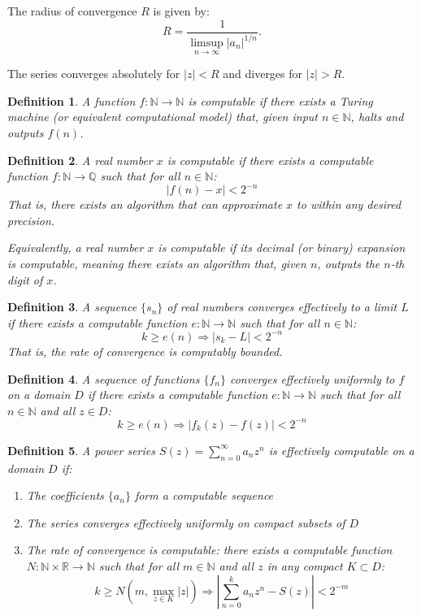 \documentclass[12pt, a4paper]{article}
\newtheorem{definition}{Definition}
\begin{document}
The radius of convergence $R$ is given by:
\[
R = \frac{1}{\limsup_{n \to \infty} |a_n|^{1/n}}.
\]

The series converges absolutely for $|z| < R$ and diverges for $|z| > R$.

\begin{definition} A function $f: \mathbb{N} \to \mathbb{N}$ is \emph{computable} if there exists a Turing machine (or equivalent computational model) that, given input $n \in \mathbb{N}$, halts and outputs $f(n)$.
\end{definition}

\begin{definition}
A real number $x$ is computable if there exists a computable function $f: \mathbb{N} \to \mathbb{Q}$ such that for all $n \in \mathbb{N}$:
\[
|f(n) - x| < 2^{-n}
\]
That is, there exists an algorithm that can approximate $x$ to within any desired precision.

Equivalently, a real number $x$ is computable if its decimal (or binary) expansion is computable, meaning there exists an algorithm that, given $n$, outputs the $n$-th digit of $x$.

\end{definition}

\begin{definition} A sequence $\{s_n\}$ of real numbers \emph{converges effectively} to a limit $L$ if there exists a computable function $e: \mathbb{N} \to \mathbb{N}$ such that for all $n \in \mathbb{N}$:
\[
k \geq e(n) \Rightarrow |s_k - L| < 2^{-n}
\]
That is, the rate of convergence is computably bounded.
\end{definition}

\begin{definition} A sequence of functions $\{f_n\}$ \emph{converges effectively uniformly} to $f$ on a domain $D$ if there exists a computable function $e: \mathbb{N} \to \mathbb{N}$ such that for all $n \in \mathbb{N}$ and all $z \in D$:
\[
k \geq e(n) \Rightarrow |f_k(z) - f(z)| < 2^{-n}
\]
\end{definition}

\begin{definition}A power series $S(z) = \sum_{n=0}^{\infty} a_n z^n$ is \emph{effectively computable} on a domain $D$ if:
\begin{enumerate}
\item The coefficients $\{a_n\}$ form a computable sequence
\item The series converges effectively uniformly on compact subsets of $D$
\item The rate of convergence is computable: there exists a computable function $N: \mathbb{N} \times \mathbb{R} \to \mathbb{N}$ such that for all $m \in \mathbb{N}$ and all $z$ in any compact $K \subset D$:
\[
k \geq N(m, \max_{z \in K} |z|) \Rightarrow \left|\sum_{n=0}^{k} a_n z^n - S(z)\right| < 2^{-m}
\]
\end{enumerate}
\end{definition}
\end{document}
